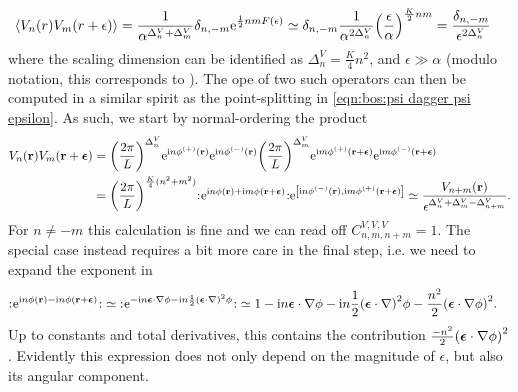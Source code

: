 \begin{align*}
\bra*{V_n(r) V_m(r+\epsilon)} &= \frac{1}{\alpha^{\Delta^V_n + \Delta^V_m}} \delta_{n,-m} \powe{\frac{1}{2} nm F(\epsilon)} \simeq \delta_{n,-m} \frac{1}{\alpha^{2\Delta^V_n}} \kla*{\frac{\epsilon}{\alpha}}^{\frac{K}{2}nm} = \frac{\delta_{n,-m}}{\epsilon^{2\Delta^V_n}}
\end{align*}
where the scaling dimension can be identified as $\Delta^V_n = \frac{K}{4}n^2$, and $\epsilon\gg \alpha$ (modulo notation, this corresponds to \cite[]{Fradkin_2013}). %
The \gls{ope} of two such operators can then be computed in a similar spirit as the point-splitting in \autoref{eqn:bos:psi dagger psi epsilon}.
As such, we start by normal-ordering the product
\begin{align*}
V_n(\textbf{r}) V_m(\textbf{r}+\bm{\epsilon}) &= \kla*{\frac{2\pi}{L}}^{\Delta^V_n} \powe{\i n\phi\eplus(\textbf{r})} \powe{\i n\phi\eminus(\textbf{r})} \kla*{\frac{2\pi}{L}}^{\Delta^V_m} \powe{\i m\phi\eplus(\textbf{r}+\bm{\epsilon})} \powe{\i m\phi\eminus(\textbf{r}+\bm{\epsilon})}\\
&= \kla*{\frac{2\pi}{L}}^{\frac{K}{4} (n^2+m^2)} \normord{\powe{\i n\phi(\textbf{r}) + \i m\phi(\textbf{r}+\bm{\epsilon})}} \powe{\klb*{\i n\phi\eminus(\textbf{r}), \i m\phi\eplus(\textbf{r}+\bm{\epsilon})}} \simeq \frac{V_{n+m}(\textbf{r})}{\epsilon^{\Delta^V_n + \Delta^V_m - \Delta^V_{n+m}}}.
\end{align*}%
For $n\neq -m$ this calculation is fine and we can read off $C^{V,V,V}_{n,m,n+m} = 1$.
The special case instead requires a bit more care in the final step, i.e. we need to expand the exponent in
\begin{align*}
\normord{\powe{\i n\phi(\textbf{r}) - \i n\phi(\textbf{r} + \bm{\epsilon})}} &\simeq \normord{\powe{-\i n\bm{\epsilon}\cdot \nabla\phi - \i n\frac{1}{2} \kla*{\bm{\epsilon}\cdot\nabla}^2 \phi}} \simeq 1 - \i n\bm{\epsilon}\cdot \nabla\phi - \i n\frac{1}{2} \kla*{\bm{\epsilon}\cdot\nabla}^2 \phi - \frac{n^2}{2} \kla*{\bm{\epsilon}\cdot \nabla\phi}^2.
\end{align*}
Up to constants and total derivatives, this contains the contribution $\frac{-n^2}{2} \kla*{\bm{\epsilon}\cdot \nabla\phi}^2$.
Evidently this expression does not only depend on the magnitude of $\epsilon$, but also its angular component.
